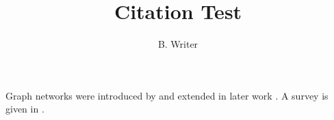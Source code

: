 \documentclass{article}
\title{Citation Test}
\author{B. Writer}
\begin{document}
\maketitle

Graph networks were introduced by \textcite{scarselli2009} and extended in
later work \parencite{kipf2017,velickovic2018}. A survey is given in
\parencite{wu2021survey}.

\printbibliography
\end{document}
